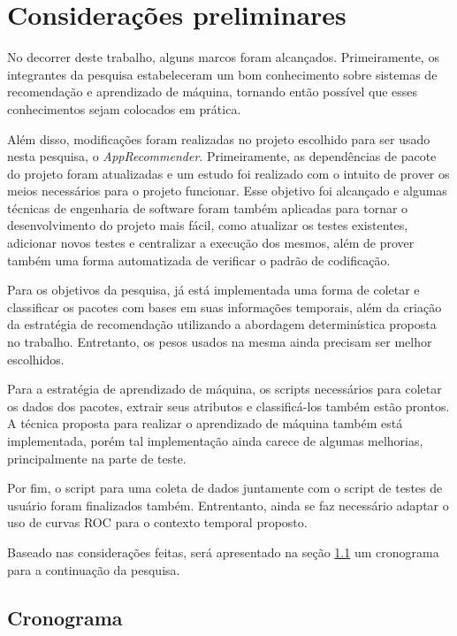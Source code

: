 \chapter[Considerações preliminares]{Considerações preliminares}

No decorrer deste trabalho, alguns marcos foram alcançados. Primeiramente, os
integrantes da pesquisa estabeleceram um bom conhecimento sobre sistemas de
recomendação e aprendizado de máquina, tornando então possível que esses
conhecimentos sejam colocados em prática.

Além disso, modificações foram realizadas no projeto escolhido para ser usado
nesta pesquisa, o \textit{AppRecommender}. Primeiramente, as dependências de pacote do
projeto foram atualizadas e um estudo foi realizado com o intuito de prover os
meios necessários para o projeto funcionar. Esse objetivo foi alcançado e
algumas técnicas de engenharia de software foram também aplicadas para tornar o
desenvolvimento do projeto mais fácil, como atualizar os testes existentes, adicionar novos testes
e centralizar a execução dos mesmos, além de prover também uma forma automatizada de
verificar o padrão de codificação.

Para os objetivos da pesquisa, já está implementada uma forma de coletar e
classificar os pacotes com bases em suas informações temporais, além da criação
da estratégia de recomendação utilizando a abordagem determinística proposta no
trabalho. Entretanto, os pesos usados na mesma ainda precisam ser melhor escolhidos.

Para a estratégia de aprendizado de máquina, os scripts necessários para coletar
os dados dos pacotes, extrair seus atributos e classificá-los também estão
prontos. A técnica proposta para realizar o aprendizado de máquina também está
implementada, porém tal implementação ainda carece de algumas melhorias,
principalmente na parte de teste.

Por fim, o script para uma coleta de dados juntamente com o script de testes de
usuário foram finalizados também. Entrentanto, ainda se faz necessário adaptar o
uso de curvas ROC para o contexto temporal proposto.

Baseado nas considerações feitas, será apresentado na seção \ref{sec:cronagrama} um cronograma
para a continuação da pesquisa.

\section{Cronograma} \label{sec:cronagrama}

